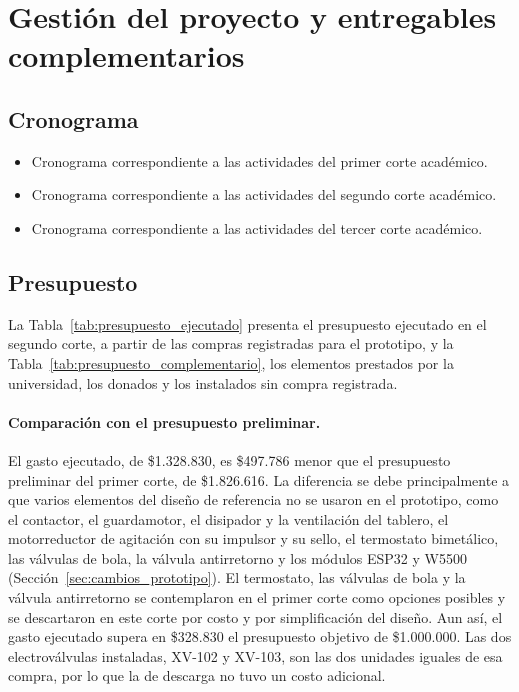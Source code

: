 \section{Gestión del proyecto y entregables complementarios}\label{sec:gestion}

\subsection{Cronograma}
\begin{itemize}
\item{Cronograma correspondiente a las actividades del primer corte académico.}

\item{Cronograma correspondiente a las actividades del segundo corte académico.}

\item{Cronograma correspondiente a las actividades del tercer corte académico.}

\end{itemize}

\subsection{Presupuesto}
La Tabla~\ref{tab:presupuesto_ejecutado} presenta el presupuesto ejecutado en el segundo corte, a partir de las compras registradas para el prototipo, y la Tabla~\ref{tab:presupuesto_complementario}, los elementos prestados por la universidad, los donados y los instalados sin compra registrada.





\paragraph{Comparación con el presupuesto preliminar.} El gasto ejecutado, de \$1.328.830, es \$497.786 menor que el presupuesto preliminar del primer corte, de \$1.826.616. La diferencia se debe principalmente a que varios elementos del diseño de referencia no se usaron en el prototipo, como el contactor, el guardamotor, el disipador y la ventilación del tablero, el motorreductor de agitación con su impulsor y su sello, el termostato bimetálico, las válvulas de bola, la válvula antirretorno y los módulos ESP32 y W5500 (Sección~\ref{sec:cambios_prototipo}). El termostato, las válvulas de bola y la válvula antirretorno se contemplaron en el primer corte como opciones posibles y se descartaron en este corte por costo y por simplificación del diseño. Aun así, el gasto ejecutado supera en \$328.830 el presupuesto objetivo de \$1.000.000. Las dos electroválvulas instaladas, XV-102 y XV-103, son las dos unidades iguales de esa compra, por lo que la de descarga no tuvo un costo adicional.


